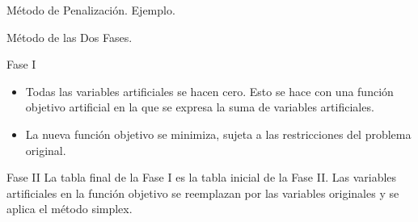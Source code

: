 \begin{frame}{Método de Penalización. Ejemplo.}{}
  {\centering
  \par}  
\end{frame}

\begin{frame}{Método de las Dos Fases.}{}

  \begin{block}{Fase I} \justifying
  \begin{itemize} \parskip3mm \justifying
  \item Todas las variables artificiales se hacen cero. Esto se hace con una función objetivo artificial en la que se expresa la suma de variables artificiales.
  \item La nueva \alert{función objetivo se minimiza}, sujeta a las restricciones del problema original.
  \end{itemize}
\end{block}
\begin{block}{Fase II}\justifying
  La tabla final de la Fase I es la tabla inicial de la Fase II. Las variables artificiales en la función objetivo se reemplazan  por las variables originales y se aplica el método simplex.
\end{block}
\end{frame}    

